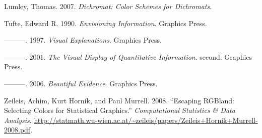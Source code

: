 Lumley, Thomas. 2007. \emph{Dichromat: Color Schemes for Dichromats}.

Tufte, Edward R. 1990. \emph{Envisioning Information}. Graphics Press.

---------. 1997. \emph{Visual Explanations}. Graphics Press.

---------. 2001. \emph{The Visual Display of Quantitative Information}.
second. Graphics Press.

---------. 2006. \emph{Beautiful Evidence}. Graphics Press.

Zeileis, Achim, Kurt Hornik, and Paul Murrell. 2008. ``Escaping RGBland:
Selecting Colors for Statistical Graphics.'' \emph{Computational
Statistics \& Data Analysis}.
\url{http://statmath.wu-wien.ac.at/~zeileis/papers/Zeileis+Hornik+Murrell-2008.pdf}.
